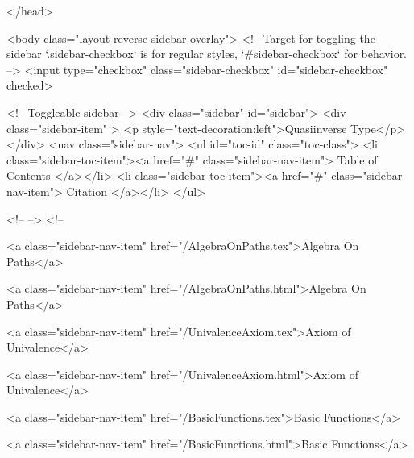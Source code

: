   
</head>




  <body class="layout-reverse sidebar-overlay">
    <!-- Target for toggling the sidebar `.sidebar-checkbox` is for regular
     styles, `#sidebar-checkbox` for behavior. -->
<input type="checkbox" class="sidebar-checkbox" id="sidebar-checkbox" checked>

<!-- Toggleable sidebar -->
<div class="sidebar" id="sidebar">
  <div class="sidebar-item" >
    <p style="text-decoration:left">Quasiinverse Type</p>
  </div>
  <nav class="sidebar-nav">
    <ul id="toc-id" class="toc-class">
  <li class="sidebar-toc-item"><a href="#" class="sidebar-nav-item"> Table of Contents </a></li>
  <li class="sidebar-toc-item"><a href="#" class="sidebar-nav-item"> Citation </a></li>
</ul>


    <!--  -->
    <!-- 
      
    
      
    
      
    
      
        
      
    
      
        
          <a class="sidebar-nav-item" href="/AlgebraOnPaths.tex">Algebra On Paths</a>
        
      
    
      
        
          <a class="sidebar-nav-item" href="/AlgebraOnPaths.html">Algebra On Paths</a>
        
      
    
      
        
          <a class="sidebar-nav-item" href="/UnivalenceAxiom.tex">Axiom of Univalence</a>
        
      
    
      
        
          <a class="sidebar-nav-item" href="/UnivalenceAxiom.html">Axiom of Univalence</a>
        
      
    
      
        
          <a class="sidebar-nav-item" href="/BasicFunctions.tex">Basic Functions</a>
        
      
    
      
        
          <a class="sidebar-nav-item" href="/BasicFunctions.html">Basic Functions</a>
        
      
    

